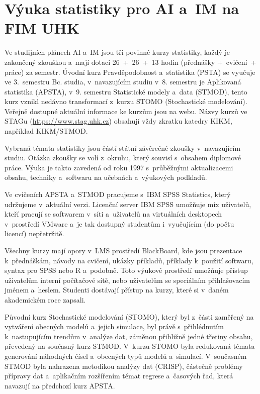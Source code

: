 \section{Výuka statistiky pro AI a~IM na FIM UHK}
Ve studijních plánech AI a~IM jsou tři povinné kurzy statistiky, každý je zakončený zkouškou a~mají dotaci 26~+~26~+~13 hodin (přednášky +~cvičení~+ práce) za semestr. Úvodní kurz Pravděpodobnost a~statistika (PSTA) se vyučuje ve 3.~semestru Bc. studia, v~navazujícím studiu v~8. semestru je Aplikovaná statistika (APSTA), v~9. semestru Statistické modely a~data (STMOD), tento kurz vznikl nedávno transformací z~kurzu STOMO (Stochastické modelování). Veřejně dostupné aktuální informace ke kurzům jsou na webu. Názvy kurzů ve STAGu (\url{https://www.stag.uhk.cz}) obsahují vždy zkratku katedry KIKM, například KIKM/STMOD.

Vybraná témata statistiky jsou částí státní závěrečné zkoušky v~navazujícím studiu. Otázka zkoušky se volí z~okruhu, který souvisí s~obsahem diplomové práce. Výuka je takto zavedená od roku 1997 s~průběžnými aktualizacemi obsahu, techniky a~softwaru na učebnách a~výukových podkladů. 

Ve cvičeních APSTA a~STMOD pracujeme s~IBM SPSS Statistics, který udržujeme v~aktuální verzi. Licenční server IBM SPSS umožňuje mix uživatelů, kteří pracují se softwarem v~síti a~uživatelů na  virtuálních desktopech v~prostředí VMware a~je tak dostupný studentům i~vyučujícím (do počtu licencí) nepřetržitě. 

Všechny kurzy mají opory v~LMS prostředí BlackBoard, kde jsou prezentace k~přednáškám, návody na cvičení, ukázky příkladů, příklady k~použití softwaru, syntax pro SPSS nebo R a~podobně. Toto výukové prostředí umožňuje přístup uživatelům interní počítačové sítě, nebo uživatelům se speciálním přihlašovacím jménem a~heslem. Studenti dostávají přístup na kurzy, které si v~daném akademickém roce zapsali. 

Původní kurz Stochastické modelování (STOMO), který byl z~části zaměřený na vytváření obecných modelů a~jejich simulace, byl právě s~přihlédnutím k~nastupujícím trendům v~analýze dat, záměnou přibližně jedné třetiny obsahu, převedený na současný kurz STMOD. V~kurzu STOMO byla redukovaná témata generování náhodných čísel a~obecných typů modelů a~simulací. V~současném STMOD byla nahrazena metodikou analýzy dat (CRISP), částečně problémy přípravy dat a~aplikačním rozšířením témat regrese a~časových řad, která navazují na předchozí kurz APSTA. 

